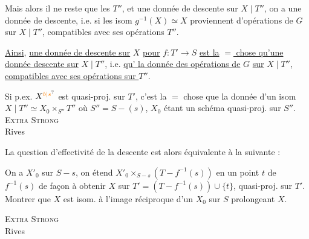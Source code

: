 Mais alors il ne reste que les $T''$, et    une donnée de descente   sur $X\mid T''$, on a une donnée de descente, i.e. si les isom $g^{-1}(X)\simeq X$ proviennent d'opérations de $G$ sur $X\mid T''$, compatibles avec ses opérations   $T''$.

\uline{Ainsi}, \uline{une donnée de descente sur} $X$ \uline{pour} $f:T'\to S$ \uline{est la} \uline{$=$ chose qu'une donnée  descente sur} $X\mid T''$, i.e. \uline{qu'}\uline{ la donnée des opérations de} $G$ \uline{sur} $X\mid T''$, \uline{compatibles avec ses opérations sur $T''$}.

Si p.ex. $X^{\unsure{b|s}}$ est quasi-proj. sur $T'$, c'est la $=$ chose que la donnée d'un isom $X\mid T''\simeq X_0\times_{S''}T''$ où $S''=S-(s)$, $X_0$ étant un schéma quasi-proj. sur $S''$.
\textsc{Extra Strong}\\
 Rives

La question d'effectivité de la descente est alors équivalente à la suivante :

On a $X'_0$ sur $S-s$, on étend $X'_0\times_{S-s}(T-f^{-1}(s))$ en un point $t$ de $f^{-1}(s)$ de façon à obtenir $X$ sur $T'=(T-f^{-1}(s))\cup\{t\}$, quasi-proj. sur $T'$. Montrer que $X$ est isom. à l'image réciproque d'un $X_0$ sur $S$ prolongeant $X$.

\textsc{Extra Strong}\\
 Rives

